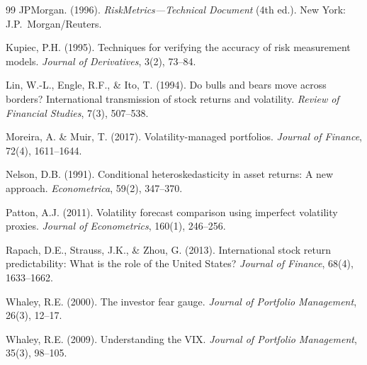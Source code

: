 \documentclass[12pt,a4paper]{article}
\begin{document}
\begin{thebibliography}{99}
JPMorgan. (1996). \textit{RiskMetrics---Technical Document} (4th ed.). New York: J.P.~Morgan/Reuters.

Kupiec, P.H. (1995). Techniques for verifying the accuracy of risk measurement models. \textit{Journal of Derivatives}, 3(2), 73--84.

Lin, W.-L., Engle, R.F., \& Ito, T. (1994). Do bulls and bears move across borders? International transmission of stock returns and volatility. \textit{Review of Financial Studies}, 7(3), 507--538.

Moreira, A. \& Muir, T. (2017). Volatility-managed portfolios. \textit{Journal of Finance}, 72(4), 1611--1644.

Nelson, D.B. (1991). Conditional heteroskedasticity in asset returns: A new approach. \textit{Econometrica}, 59(2), 347--370.

Patton, A.J. (2011). Volatility forecast comparison using imperfect volatility proxies. \textit{Journal of Econometrics}, 160(1), 246--256.

Rapach, D.E., Strauss, J.K., \& Zhou, G. (2013). International stock return predictability: What is the role of the United States? \textit{Journal of Finance}, 68(4), 1633--1662.

Whaley, R.E. (2000). The investor fear gauge. \textit{Journal of Portfolio Management}, 26(3), 12--17.

Whaley, R.E. (2009). Understanding the VIX. \textit{Journal of Portfolio Management}, 35(3), 98--105.

\end{thebibliography}
\end{document}
